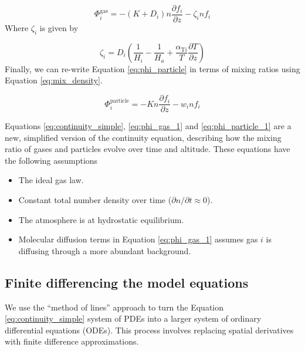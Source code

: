 \documentclass{article}
\begin{document}
\begin{equation} \label{eq:phi_gas_1}
  \boxed{\Phi_{i}^\text{gas} = - \left( K + D_{i} \right)n\frac{\partial f_{i}}{\partial z} - \zeta_{i}nf_{i}}
\end{equation}
Where $\zeta_{i}$ is given by

\begin{equation}
  \zeta_{i} = D_{i}\left( \frac{1}{H_{i}} - \frac{1}{H_{a}} + \frac{\alpha_{\text{Ti}}}{T}\frac{\partial T}{\partial z} \right)
\end{equation}
Finally, we can re-write Equation \eqref{eq:phi_particle} in terms of mixing ratios using Equation \eqref{eq:mix_density}.

\begin{equation} \label{eq:phi_particle_1}
  \boxed{\Phi_{i}^\text{particle} = - Kn\frac{\partial f_{i}}{\partial z} - w_i n f_{i}}
\end{equation}

Equations \eqref{eq:continuity_simple}, \eqref{eq:phi_gas_1} and \eqref{eq:phi_particle_1} are a new, simplified version of the continuity equation, describing how the mixing ratio of gases and particles evolve over time and altitude. These equations have the following assumptions
\begin{itemize}
  \item The ideal gas law.
  \item Constant total number density over time ($\partial n / \partial t \approx 0$).
  \item The atmosphere is at hydrostatic equilibrium.
  \item Molecular diffusion terms in Equation \eqref{eq:phi_gas_1} assumes gas $i$ is diffusing through a more abundant background.
\end{itemize}

\subsection{Finite differencing the model equations}
We use the ``method of lines'' approach to turn the Equation \eqref{eq:continuity_simple} system of PDEs into a larger system of ordinary differential equations (ODEs). This process involves replacing spatial derivatives with finite difference approximations.
\end{document}

